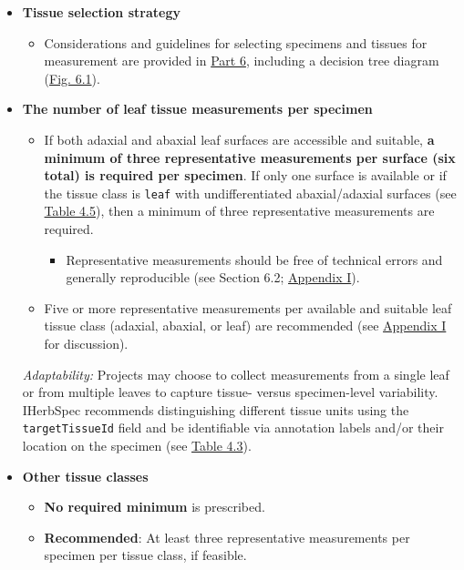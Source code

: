 \documentclass[
  letterpaper,
  DIV=11,
  numbers=noendperiod]{scrreprt}
\providecommand{\tightlist}{%
  \setlength{\itemsep}{0pt}\setlength{\parskip}{0pt}}
\begin{document}
\begin{itemize}
\item
  \textbf{Tissue selection strategy}

  \begin{itemize}
  \tightlist
  \item
    Considerations and guidelines for selecting specimens and tissues
    for measurement are provided in \href{part6-guidelines.qmd}{Part 6},
    including a decision tree diagram (\hyperref[f6-1]{Fig. 6.1}).
  \end{itemize}
\item
  \textbf{The number of leaf tissue measurements per specimen}

  \begin{itemize}
  \tightlist
  \item
    If both adaxial and abaxial leaf surfaces are accessible and
    suitable, \textbf{a minimum of three representative measurements per
    surface (six total) is required per specimen}. If only one surface
    is available or if the tissue class is \texttt{leaf} with
    undifferentiated abaxial/adaxial surfaces (see
    \hyperref[tbl-4-5]{Table 4.5}), then a minimum of three
    representative measurements are required.

    \begin{itemize}
    \tightlist
    \item
      Representative measurements should be free of technical errors and
      generally reproducible (see Section 6.2;
      \href{appendix1.qmd}{Appendix I}).\\
    \end{itemize}
  \item
    Five or more representative measurements per available and suitable
    leaf tissue class (adaxial, abaxial, or leaf) are recommended (see
    \href{appendix1.qmd}{Appendix I} for discussion).
  \end{itemize}

  \emph{Adaptability:} Projects may choose to collect measurements from
  a single leaf or from multiple leaves to capture tissue- versus
  specimen-level variability. IHerbSpec recommends distinguishing
  different tissue units using the \texttt{targetTissueId} field and be
  identifiable via annotation labels and/or their location on the
  specimen (see \hyperref[tbl-4-3]{Table 4.3}).
\item
  \textbf{Other tissue classes}

  \begin{itemize}
  \tightlist
  \item
    \textbf{No required minimum} is prescribed.\\
  \item
    \textbf{Recommended}: At least three representative measurements per
    specimen per tissue class, if feasible.
  \end{itemize}
\end{itemize}
\end{document}
